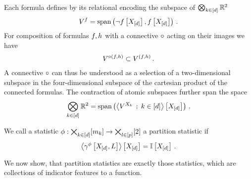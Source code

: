 
\begin{example}
    Each formula defines by its relational encoding the subspace of $\bigotimes_{k\in[d]}\mathbb{R}^2$
    \begin{align*}
        V^{f} = \mathrm{span}\left(\lnot f\left[X_{[d]}\right],f\left[X_{[d]}\right]\right) \, .
    \end{align*}
    For composition of formulas $f,h$ with a connective $\circ$ acting on their images we have %
    \begin{align*}
        V^{\circ(f,h)}
        \subset V^{(f,h)} \, .
    \end{align*}
    A connective $\circ$ can thus be understood as a selection of a two-dimensional subspace in the four-dimensional subspace of the cartesian product of the connected formulas.
    The contraction of atomic subspaces further span the space
    \begin{align*}
        \bigotimes_{k\in[d]}\mathbb{R}^2 = \mathrm{span}\left(\left\langle 
            V^{X_{k}} \, : \, k\in[d]
        \right\rangle \left[ X_{[d]} \right]\right) \, .
    \end{align*}
\end{example}



\begin{definition}
    We call a statistic $\phi : \bigtimes_{k\in[d]}[m_{k}] \rightarrow \bigtimes_{l\in[p]}[2]$ a partition statistic if
    \begin{align*}
        \left\langle \gamma^{\phi}\left[X_{[d]},L\right]\right\rangle \left[ X_{[d]} \right] = \mathbb{I}\left[X_{[d]}\right] \, .
    \end{align*}
\end{definition}

We now show, that partition statistics are exactly those statistics, which are collections of indicator features to a function.

